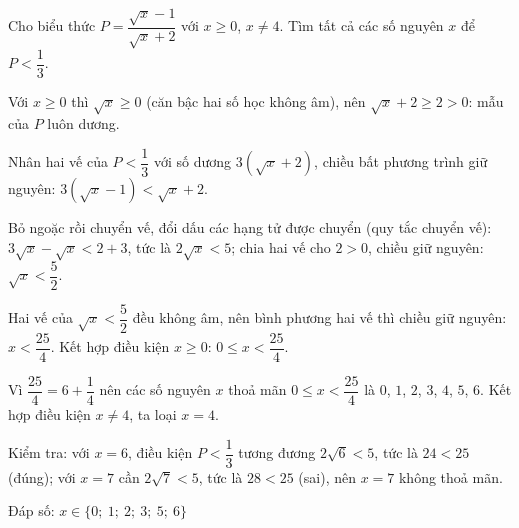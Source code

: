 \begin{problem}[9DS-BPT-029]
Cho biểu thức $P = \dfrac{\sqrt{x} - 1}{\sqrt{x} + 2}$ với $x \geq 0$, $x \neq 4$. Tìm tất cả các số nguyên $x$ để $P < \dfrac{1}{3}$.

\begin{solution}
Với $x \geq 0$ thì $\sqrt{x} \geq 0$ (căn bậc hai số học không âm), nên $\sqrt{x} + 2 \geq 2 > 0$: mẫu của $P$ luôn dương.

Nhân hai vế của $P < \dfrac{1}{3}$ với số dương $3(\sqrt{x} + 2)$, chiều bất phương trình giữ nguyên: $3(\sqrt{x} - 1) < \sqrt{x} + 2$.

Bỏ ngoặc rồi chuyển vế, đổi dấu các hạng tử được chuyển (quy tắc chuyển vế): $3\sqrt{x} - \sqrt{x} < 2 + 3$, tức là $2\sqrt{x} < 5$; chia hai vế cho $2 > 0$, chiều giữ nguyên: $\sqrt{x} < \dfrac{5}{2}$.

Hai vế của $\sqrt{x} < \dfrac{5}{2}$ đều không âm, nên bình phương hai vế thì chiều giữ nguyên: $x < \dfrac{25}{4}$. Kết hợp điều kiện $x \geq 0$: $0 \leq x < \dfrac{25}{4}$.

Vì $\dfrac{25}{4} = 6 + \dfrac{1}{4}$ nên các số nguyên $x$ thoả mãn $0 \leq x < \dfrac{25}{4}$ là $0$, $1$, $2$, $3$, $4$, $5$, $6$. Kết hợp điều kiện $x \neq 4$, ta loại $x = 4$.

Kiểm tra: với $x = 6$, điều kiện $P < \dfrac{1}{3}$ tương đương $2\sqrt{6} < 5$, tức là $24 < 25$ (đúng); với $x = 7$ cần $2\sqrt{7} < 5$, tức là $28 < 25$ (sai), nên $x = 7$ không thoả mãn.

Đáp số: $\boxed{x \in \{0;\ 1;\ 2;\ 3;\ 5;\ 6\}}$
\end{solution}
\end{problem}

